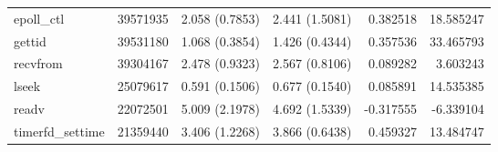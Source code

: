 \begin{tabular}{>{\ttfamily}lrrrrr}
                      epoll_ctl &    39571935 &           2.058 (0.7853) &           2.441 (1.5081) &        0.382518 &    18.585247 \\
                         gettid &    39531180 &           1.068 (0.3854) &           1.426 (0.4344) &        0.357536 &    33.465793 \\
                       recvfrom &    39304167 &           2.478 (0.9323) &           2.567 (0.8106) &        0.089282 &     3.603243 \\
                          lseek &    25079617 &           0.591 (0.1506) &           0.677 (0.1540) &        0.085891 &    14.535385 \\
                          readv &    22072501 &           5.009 (2.1978) &           4.692 (1.5339) &       -0.317555 &    -6.339104 \\
                timerfd_settime &    21359440 &           3.406 (1.2268) &           3.866 (0.6438) &        0.459327 &    13.484747 \\
\bottomrule
\end{tabular}
